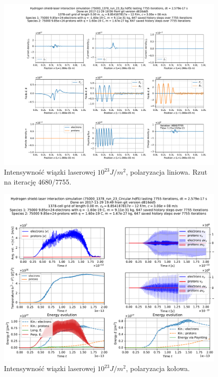 \begin{figure}[h!]
  \includegraphics[width=\textwidth]{Images/75000_1378_run_23_Ey_004680}
  \caption{Intensywność wiązki laserowej $10^{23} J/m^2$, polaryzacja liniowa. Rzut na iterację 4680/7755.\label{fig:laser-23-Ey-snapshot}}
\end{figure}


\begin{figure}[h!]
  \includegraphics[width=\textwidth]{Images/75000_1378_run_23_Circular}
  \caption{Intensywność wiązki laserowej $10^{23} J/m^2$, polaryzacja kołowa.\label{fig:laser-23-Circular}}
\end{figure}

